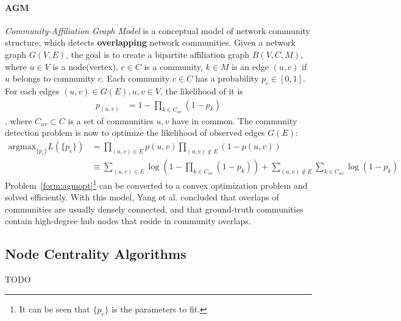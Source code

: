 \paragraph{AGM} \textit{Community-Affiliation Graph Model}\citep{yang2012structure}
is a conceptual model of network community structure, which detects 
\textbf{overlapping} network communities. Given a network graph $G(V,E)$, the
goal is to create a bipartite affiliation graph $B(V, C, M)$, where
$u\in V$ is a node(vertex), $c\in C$ is a community, 
$k\in M$ is an edge $(u,c)$ if $u$ belongs to community $c$. Each
community $c\in C$ has a probability $p_c\in [0,1]$.
For each edges $(u,v)\in G(E), u,v \in V$, the likelihood of it is 
\begin{align}
    p_(u,v) &= 1- \prod_{k\in C_{uv}}(1-p_k)
\end{align},
where $C_{uv}\subset C$ is a set of communities $u,v$ have in common.
The community detection problem is now to optimize the likelihood of 
observed edges $G(E)$: 
\begin{align} \label{form:agmopt}
    \text{argmax}_{\{p_c\}} L(\{p_c\}) &= \prod_{(u,v)\in E} p(u,v) 
        \prod_{(u,v)\notin E} (1 - p(u,v))\\
    &\equiv \sum_{(u,v)\in E}\log{(1 - \prod_{k\in C_{uv}} (1-p_k))} + 
        \sum_{(u,v)\notin E}\sum_{k\in C_{uv}} \log{(1-p_k)}
\end{align}
Problem~\ref{form:agmopt}\footnote{It can be seen that $\{p_c\}$ is the parameters to fit.}
can be converted to a convex optimization 
problem and solved efficiently\citep{yang2012structure}. 
With this model, Yang et al.\citep{yang2012structure} concluded that overlaps of communities are
usually densely connected, and that ground-truth communities contain
high-degree hub nodes that reside in community overlaps.

\subsection{Node Centrality Algorithms}
\par TODO
